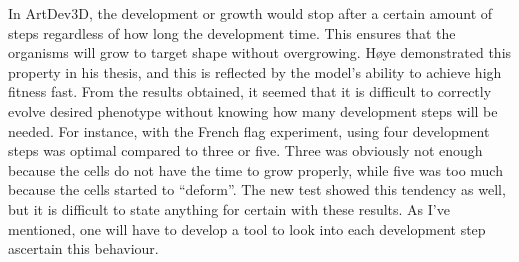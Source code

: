 In ArtDev3D, the development or growth would stop after a certain amount of steps regardless of how long the development time. This ensures that the organisms will grow to target shape without overgrowing. H{\o}ye\cite{hoye2006} demonstrated this property in his thesis, and this is reflected by the model's ability to achieve high fitness fast. From the results obtained, it seemed that it is difficult to correctly evolve desired phenotype without knowing how many development steps will be needed. For instance, with the French flag experiment, using four development steps was optimal compared to three or five. Three was obviously not enough because the cells do not have the time to grow properly, while five was too much because the cells started to ``deform''. The new test showed this tendency as well, but it is difficult to state anything for certain with these results. As I've mentioned, one will have to develop a tool to look into each development step ascertain this behaviour.
